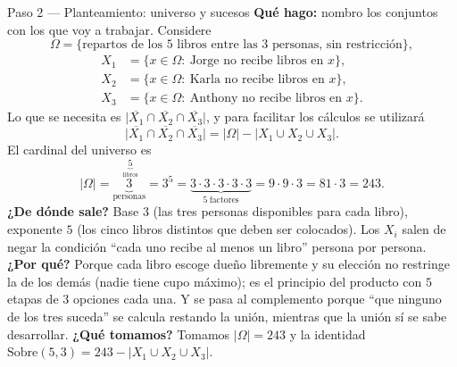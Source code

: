 \documentclass[11pt]{article}
\begin{document}
\begin{sol}
\begin{paso}{Paso 2 --- Planteamiento: universo y sucesos}
\textbf{Qué hago:} nombro los conjuntos con los que voy a trabajar. Considere
\[
\Omega=\{\text{repartos de los 5 libros entre las 3 personas, sin restricción}\},
\]
\[
\begin{aligned}
X_1&=\{x\in\Omega:\ \text{Jorge no recibe libros en }x\},\\
X_2&=\{x\in\Omega:\ \text{Karla no recibe libros en }x\},\\
X_3&=\{x\in\Omega:\ \text{Anthony no recibe libros en }x\} .
\end{aligned}
\]
Lo que se necesita es $\bigl|\overline{X_1}\cap\overline{X_2}\cap\overline{X_3}\bigr|$, y para facilitar los cálculos se utilizará
\[
\bigl|\overline{X_1}\cap\overline{X_2}\cap\overline{X_3}\bigr|=|\Omega|-\bigl|X_1\cup X_2\cup X_3\bigr| .
\]
El cardinal del universo es
\[
|\Omega|=\underbrace{3}_{\text{personas}}^{\;\underbrace{5}_{\text{libros}}}=3^5=\underbrace{3\cdot3\cdot3\cdot3\cdot3}_{5\ \text{factores}}=9\cdot 9\cdot 3=81\cdot 3=243 .
\]
\textbf{¿De dónde sale?} Base $3$ (las tres personas disponibles para cada libro), exponente $5$ (los cinco libros distintos que deben ser colocados). Los $X_i$ salen de negar la condición ``cada uno recibe al menos un libro'' persona por persona.
\textbf{¿Por qué?} Porque cada libro escoge dueño libremente y su elección no restringe la de los demás (nadie tiene cupo máximo); es el principio del producto con $5$ etapas de $3$ opciones cada una. Y se pasa al complemento porque ``que ninguno de los tres suceda'' se calcula restando la unión, mientras que la unión sí se sabe desarrollar.
\textbf{¿Qué tomamos?} Tomamos $|\Omega|=243$ y la identidad $\text{Sobre}(5,3)=243-\bigl|X_1\cup X_2\cup X_3\bigr|$.
\end{paso}


\end{sol}
\end{document}
